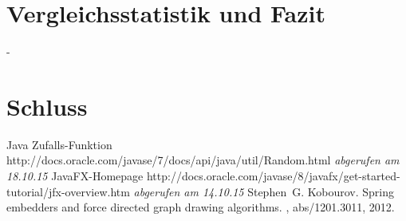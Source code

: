 \documentclass[12pt]{article}
\begin{document}
\section{Vergleichsstatistik und Fazit}
\newpage
-
\newpage

\section{Schluss}
\newpage

%
%
\begin{thebibliography}{9}
 Java Zufalls-Funktion http://docs.oracle.com/javase/7/docs/api/java/util/Random.html \emph{abgerufen am 18.10.15}
 JavaFX-Homepage http://docs.oracle.com/javase/8/javafx/get-started-tutorial/jfx-overview.htm \emph{abgerufen am 14.10.15}
Stephen~G. Kobourov.
\newblock Spring embedders and force directed graph drawing algorithms.
, abs/1201.3011, 2012.

\end{thebibliography}
\end{document}
